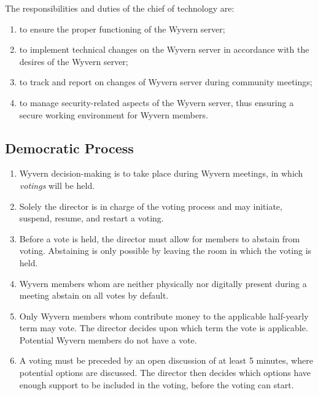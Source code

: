 \documentclass[a4paper]{article}
\begin{document}
\begin{appendices}
\begin{enumerate}
    \begin{item}
        The responsibilities and duties of the chief of technology are:
        \begin{enumerate}
            \item to ensure the proper functioning of the Wyvern server;
            \item to implement technical changes on the Wyvern server in accordance with the desires of the Wyvern server;
            \item to track and report on changes of Wyvern server during community meetings;
            \item to manage security-related aspects of the Wyvern server, thus ensuring a secure working environment for Wyvern members.
        \end{enumerate}
    \end{item}
\end{enumerate}

\subsection{Democratic Process}
\begin{enumerate}
    \item Wyvern decision-making is to take place during Wyvern meetings, in which \emph{votings} will be held.

    \item Solely the director is in charge of the voting process and may initiate, suspend, resume, and restart a voting.

    \item Before a vote is held, the director must allow for members to abstain from voting. Abstaining is only possible by leaving the room in which the voting is held.
    
    \item Wyvern members whom are neither physically nor digitally present during a meeting abstain on all votes by default.

    \item Only Wyvern members whom contribute money to the applicable half-yearly term may vote. The director decides upon which term the vote is applicable. Potential Wyvern members do not have a vote.
    
    \item A voting must be preceded by an open discussion of at least 5 minutes, where potential options are discussed. The director then decides which options have enough support to be included in the voting, before the voting can start.
    

\end{enumerate}
\end{appendices}
\end{document}
